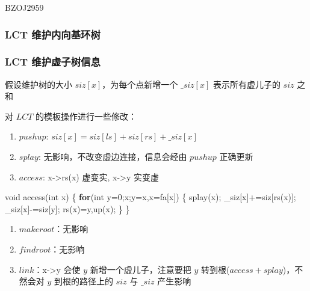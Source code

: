 \documentclass[
]{article}
\newenvironment{Shaded}{}{}
\newcommand{\ControlFlowTok}[1]{\textcolor[rgb]{0.00,0.44,0.13}{\textbf{#1}}}
\newcommand{\DataTypeTok}[1]{\textcolor[rgb]{0.56,0.13,0.00}{#1}}
\newcommand{\DecValTok}[1]{\textcolor[rgb]{0.25,0.63,0.44}{#1}}
\newcommand{\NormalTok}[1]{#1}
\begin{document}
BZOJ2959

\hypertarget{lct-ux7ef4ux62a4ux5185ux5411ux57faux73afux6811}{%
\subsubsection{LCT
维护内向基环树}\label{lct-ux7ef4ux62a4ux5185ux5411ux57faux73afux6811}}

\hypertarget{lct-ux7ef4ux62a4ux865aux5b50ux6811ux4fe1ux606f}{%
\subsubsection{LCT
维护虚子树信息}\label{lct-ux7ef4ux62a4ux865aux5b50ux6811ux4fe1ux606f}}

假设维护树的大小 \(siz[x]\)，为每个点新增一个 \(\_siz[x]\)
表示所有虚儿子的 \(siz\) 之和

对 \(LCT\) 的模板操作进行一些修改：

\begin{enumerate}
\def\labelenumi{\arabic{enumi}.}
\item
  \(pushup\): \(siz[x]=siz[ls]+siz[rs]+\_siz[x]\)
\item
  \(splay\): 无影响，不改变虚边连接，信息会经由 \(pushup\) 正确更新
\item
  \(access\): x-\textgreater rs(x) 虚变实, x-\textgreater y 实变虚
\end{enumerate}

\begin{Shaded}
\begin{Highlighting}[]
\DataTypeTok{void}\NormalTok{ access(}\DataTypeTok{int}\NormalTok{ x)}
\NormalTok{\{}
    \ControlFlowTok{for}\NormalTok{(}\DataTypeTok{int}\NormalTok{ y=}\DecValTok{0}\NormalTok{;x;y=x,x=fa[x])}
\NormalTok{    \{}
\NormalTok{        splay(x);}
\NormalTok{        \_siz[x]+=siz[rs(x)];}
\NormalTok{        \_siz[x]{-}=siz[y];}
\NormalTok{        rs(x)=y,up(x);}
\NormalTok{    \}}
\NormalTok{\}}
\end{Highlighting}
\end{Shaded}

\begin{enumerate}
\def\labelenumi{\arabic{enumi}.}
\setcounter{enumi}{3}
\item
  \(makeroot\)：无影响
\item
  \(findroot\)：无影响
\item
  \(link\)：x-\textgreater y 会使 \(y\) 新增一个虚儿子，注意要把 \(y\)
  转到根(\(access+splay\))，不然会对 \(y\) 到根的路径上的 \(siz\) 与
  \(\_siz\) 产生影响
\end{enumerate}
\end{document}
